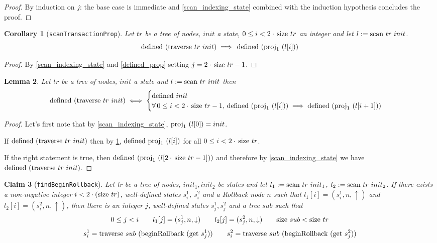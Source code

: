 \documentclass{article}
\newtheorem{lemma}{Lemma}
\newtheorem{claim}[lemma]{Claim}
\newtheorem{corollary}[lemma]{Corollary}
\newcommand{\textfun}[1]{\textup{#1}}
\newcommand{\textcode}[1]{\texttt{#1}}
\newcommand{\traverse}[2]{\textfun{traverse}\ #1\ #2}
\newcommand{\scan}[2]{\textfun{scan}\ #1\ #2}
\newcommand{\up}{\uparrow}
\newcommand{\down}{\downarrow}
\newcommand{\beginRb}[1]{\textfun{beginRollback}\ #1}
\newcommand{\defined}[1]{\textfun{defined}\ #1}
\newcommand{\get}[1]{\textfun{get}\ #1}
\newcommand{\size}[1]{\textfun{size}\ #1}
\newcommand{\fst}[1]{\textfun{proj}_1\ #1}
\begin{document}
\begin{proof}
    By induction on $j$: the base case is immediate and \cref{scan_indexing_state}
     combined with the induction hypothesis concludes the proof.
\end{proof}

\begin{corollary}[\textcode{scanTransactionProp}]
    \label{defined_traverse_prop}
    Let $tr$ be a tree of nodes, $init$ a state, $0 \leq i < 2 \cdot\, \size{tr} $ an integer and let $l:= \scan{tr}{init}$.
    \[\defined (\traverse{tr}{init}) \implies\, \defined (\fst{(l[i])})\]
\end{corollary}

\begin{proof}
    By \cref{scan_indexing_state} and \cref{defined_prop} setting $j = 2 \cdot\, \size{tr} - 1$.
\end{proof}

\begin{lemma}
    \label{defined_alt_def}
    Let $tr$ be a tree of nodes, $init$ a state and $l := \scan{tr}{init}$ then 
    \[\defined{(\traverse{tr}{init})} \iff 
    \begin{cases}
        \defined{init} \\
        \forall\, 0 \leq i < 2 \cdot\, \size{tr} - 1, \, \defined{(\fst{(l[i])})} \implies \defined{(\fst{(l[i + 1])})} \,
    \end{cases}\]
        
\end{lemma}

\begin{proof}
    Let's first note that by \cref{scan_indexing_state}, $\fst{(l[0])} = init$.

    If $\defined{(\traverse{tr}{init})}$ then by \cref{defined_traverse_prop}, $\defined{\fst{(l[i])}}$ for all $0 \leq i < 2 \cdot\, \size{tr}$.
    
    If the right statement is true, then $\defined{(\fst{(l[2 \cdot \, \size{tr} - 1])})}$ and therefore by \cref{scan_indexing_state} we have $\defined{(\traverse{tr}{init})}$.
\end{proof}


\begin{claim}[\textcode{findBeginRollback}]
    \label{find_two_begin_rb}
    Let tr be a tree of nodes, $init_1, init_2$ be states and let $l_1 := \scan{tr}{init_1}$, $l_2 := \scan{tr}{init_2}$.
    If there exists a non-negative integer $i < 2 \cdot (\size{tr})$, well-defined states $s^1_i$, $s^2_i$ and a Rollback node $n$ such that 
    $l_1[i] = (s^1_i, n, \up)$ and $l_2[i] = (s^2_i, n, \up)$, then there is an integer $j$, well-defined states $s^1_j, s^2_j$ and a tree $sub$ such that 
    \[0 \leq j < i \qquad l_1[j] = (s^1_j, n, \down) \qquad  l_2[j] = (s^2_j, n, \down) \qquad \size{sub} < \size{tr}\]
    \[s^1_i = \traverse{sub}{(\beginRb{(\get{s^1_j})})} \qquad s^2_i = \traverse{sub}{(\beginRb{(\get{s^2_j})})}\]
\end{claim}
\end{document}
